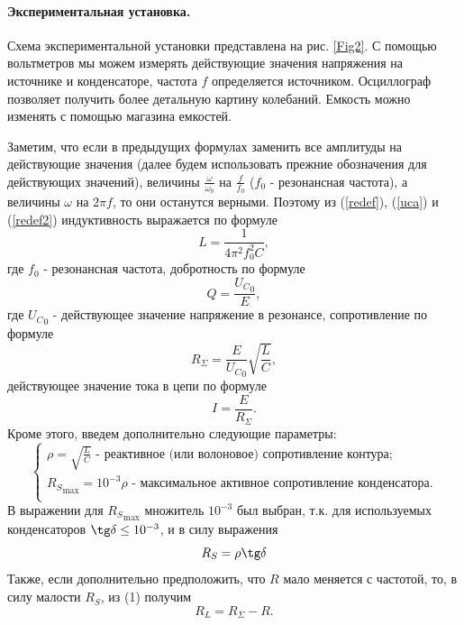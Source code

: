 \documentclass[12pt,a4paper]{article}
\begin{document}
\paragraph{Экспериментальная установка.} Схема экспериментальной установки представлена на рис. \ref{Fig2}. С помощью вольтметров мы можем измерять действующие значения напряжения на источнике и конденсаторе, частота $f$ определяется источником. Осциллограф позволяет получить более детальную картину колебаний. Емкость можно изменять с помощью магазина емкостей.

Заметим, что если в предыдущих формулах заменить все амплитуды на действующие значения  (далее будем использовать прежние обозначения для действующих значений), величины $\frac{\omega}{\omega_0}$ на $\frac{f}{f_0}$ ($f_0$ - резонансная частота), а величины $\omega$ на $2\pi f$, то они останутся верными. Поэтому из (\ref{redef}), (\ref{uca}) и (\ref{redef2}) индуктивность выражается по формуле
\begin{equation}
L = \frac{1}{4\pi^2 f_0^2 C}\label{ind},
\end{equation}
где $f_0$ - резонансная частота, добротность по формуле 
\begin{equation}
Q = \frac{{U_C}_0}{E}\label{q},
\end{equation}
где ${U_C}_0$ - действующее значение напряжение в резонансе,  сопротивление по формуле
\begin{equation}
R_\Sigma = \frac{E}{{U_C}_0}\sqrt{\frac{L}{C}}\label{rsig},
\end{equation}
действующее значение тока в цепи по формуле 
\begin{equation}
I = \frac{E}{R_\Sigma}.
\end{equation}
Кроме этого, введем дополнительно следующие параметры:
\begin{equation}
\begin{cases}
\rho = \sqrt{\frac{L}{C}}\text{ - реактивное (или волоновое) сопротивление контура};\\
{R_S}_\text{max} = 10^{-3}\rho\text{ - максимальное активное сопротивление конденсатора}\label{redef3}.\\
\end{cases} 
\end{equation}
В выражении для ${R_S}_\text{max}$ множитель $10^{-3}$ был выбран, т.к. для используемых конденсаторов $\tg\delta \le 10^{-3}$, и в силу выражения
\begin{equation}
R_S = \rho\tg\delta
\end{equation} 
Также, если дополнительно предположить, что $R$ мало меняется с частотой, то, в силу малости $R_S$, из (1) получим
\begin{equation}
R_L = R_\Sigma - R.\label{rle}
\end{equation}
\end{document}
